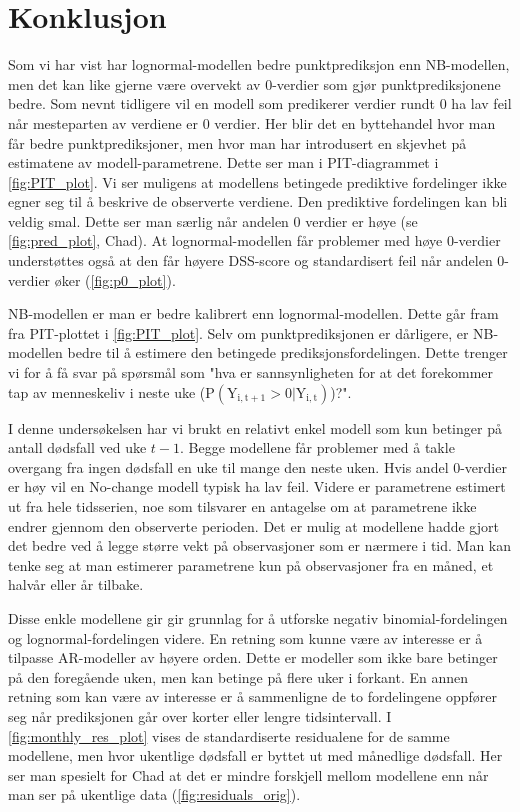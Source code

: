 \clearpage
\section{Konklusjon}

Som vi har vist har lognormal-modellen bedre punktprediksjon enn NB-modellen,
men det kan like gjerne være  overvekt av 0-verdier som gjør punktprediksjonene
bedre. Som nevnt tidligere vil en modell som predikerer verdier rundt 0 ha lav
feil når mesteparten av verdiene er 0 verdier. Her blir det en byttehandel hvor
man får bedre punktprediksjoner, men hvor man har introdusert en skjevhet på
estimatene av modell-parametrene. Dette ser man i PIT-diagrammet i
\cref{fig:PIT_plot}. Vi ser muligens at modellens betingede prediktive
fordelinger ikke egner seg til å beskrive de observerte verdiene. Den
prediktive fordelingen kan bli veldig smal. Dette ser man særlig når andelen 0
verdier er høye (se \cref{fig:pred_plot}, Chad). At lognormal-modellen får
problemer med høye 0-verdier understøttes også at den får høyere DSS-score og
standardisert feil når andelen 0-verdier øker (\cref{fig:p0_plot}). 

NB-modellen er man er bedre kalibrert enn lognormal-modellen. Dette går fram
fra PIT-plottet i \cref{fig:PIT_plot}. Selv om punktprediksjonen er dårligere,
er NB-modellen bedre til å estimere den betingede prediksjonsfordelingen. Dette
trenger vi for å få svar på spørsmål som "hva er sannsynligheten for at det
forekommer tap av menneskeliv i neste uke ($\mathrm{P(Y_{i,t+1} > 0|
Y_{i,t})}$)?". 

I denne undersøkelsen har vi brukt en relativt enkel modell som kun betinger på
antall dødsfall ved uke $t-1$. Begge modellene får problemer med å takle
overgang fra ingen dødsfall en uke til mange den neste uken. Hvis andel
0-verdier er høy vil en No-change modell typisk ha lav feil. Videre er
parametrene estimert ut fra hele tidsserien, noe som tilsvarer en antagelse om
at parametrene ikke endrer gjennom den observerte perioden. Det er mulig at
modellene hadde gjort det bedre ved å legge større vekt på observasjoner som
er nærmere i tid. Man kan tenke seg at man estimerer parametrene kun på
observasjoner fra en måned, et halvår eller år tilbake.

Disse enkle modellene gir gir grunnlag for å utforske negativ
binomial-fordelingen og lognormal-fordelingen videre. En retning som kunne være
av interesse er å tilpasse AR-modeller av høyere orden. Dette er modeller
som ikke bare betinger på den foregående uken, men kan betinge på flere uker i
forkant. En annen retning som kan være av interesse er å sammenligne de to
fordelingene oppfører seg når prediksjonen går over korter eller lengre
tidsintervall. I \cref{fig:monthly_res_plot} vises de standardiserte
residualene for de samme modellene, men hvor ukentlige dødsfall er byttet ut
med månedlige dødsfall. Her ser man spesielt for Chad at det er mindre
forskjell mellom modellene enn når man ser på ukentlige data
(\cref{fig:residuals_orig}).


